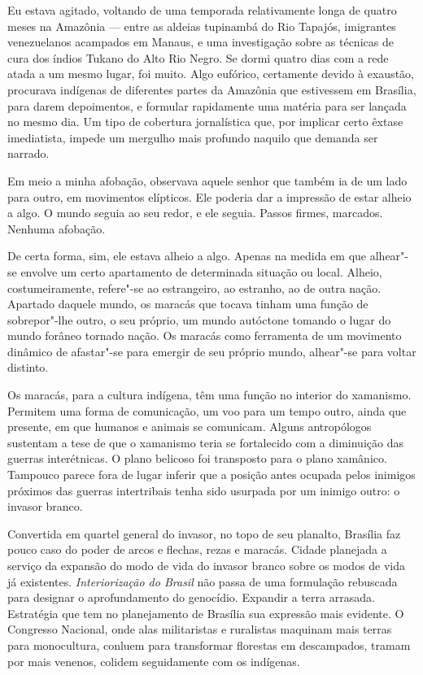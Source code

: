 Eu estava agitado, voltando de uma temporada relativamente longa de
quatro meses na Amazônia --- entre as aldeias tupinambá do Rio Tapajós,
imigrantes venezuelanos acampados em Manaus, e uma investigação sobre as
técnicas de cura dos índios Tukano do Alto Rio Negro. Se dormi quatro
dias com a rede atada a um mesmo lugar, foi muito. Algo eufórico,
certamente devido à exaustão, procurava indígenas de diferentes partes da
Amazônia que estivessem em Brasília, para darem depoimentos, e formular
rapidamente uma matéria para ser lançada no mesmo dia. Um tipo de
cobertura jornalística que, por implicar certo êxtase imediatista,
impede um mergulho mais profundo naquilo que demanda ser narrado.

Em meio a minha afobação, observava aquele
senhor que também ia de um lado para outro, em movimentos elípticos. Ele
poderia dar a impressão de estar alheio a algo. O mundo seguia ao seu
redor, e ele seguia. Passos firmes, marcados. Nenhuma afobação.

De certa forma, sim, ele estava alheio a algo. Apenas na medida em que
alhear"-se envolve um certo apartamento de determinada situação ou local.
Alheio, costumeiramente, refere"-se ao estrangeiro, ao estranho, ao de
outra nação. Apartado daquele mundo, os maracás que tocava tinham uma
função de sobrepor"-lhe outro, o seu próprio, um mundo autóctone tomando
o lugar do mundo forâneo tornado nação. Os maracás como ferramenta de um
movimento dinâmico de afastar"-se para emergir de seu próprio mundo,
alhear"-se para voltar distinto.

Os maracás, para a cultura indígena, têm uma função no interior do
xamanismo. Permitem uma forma de comunicação, um voo para um tempo
outro, ainda que presente, em que humanos e animais se comunicam. Alguns
antropólogos sustentam a tese de que o xamanismo teria se fortalecido
com a diminuição das guerras interétnicas. O plano belicoso foi
transposto para o plano xamânico. Tampouco parece fora de lugar inferir
que a posição antes ocupada pelos inimigos próximos das guerras
intertribais
tenha sido usurpada por um inimigo outro: o invasor branco.

Convertida em quartel general do invasor, no topo de seu planalto,
Brasília faz pouco caso do poder de arcos e flechas, rezas e maracás.
Cidade planejada a serviço da expansão do modo de vida do invasor branco
sobre os modos de vida já existentes. \emph{Interiorização do
Brasil} não passa de uma formulação rebuscada para designar o
aprofundamento do genocídio. Expandir a terra arrasada. Estratégia que
tem no planejamento de Brasília sua expressão mais evidente. O Congresso
Nacional, onde alas militaristas e ruralistas maquinam mais terras para
monocultura, conluem para transformar florestas em descampados, tramam
por mais venenos, colidem seguidamente com os indígenas.

